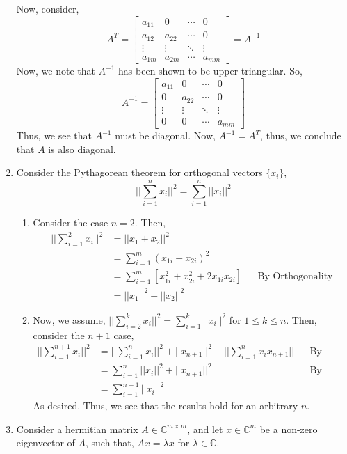 \documentclass[letterpaper,10pt]{article}
\newcommand{\C}{\mathbb{C}}
\newcommand{\NORM}{\Big|\Big|}
\begin{document}
\begin{enumerate}
Now, consider,
\[A^T=\begin{bmatrix}
a_{11} & 0 & \cdots & 0\\
a_{12} & a_{22} & \cdots & 0\\
\vdots & \vdots & \ddots & \vdots\\
a_{1m} & a_{2m} & \cdots & a_{mm}
\end{bmatrix}=A^{-1} \]
Now, we note that $A^{-1}$ has been shown to be upper triangular. So,
\[A^{-1}=\begin{bmatrix}
a_{11} & 0 & \cdots & 0\\
0 & a_{22} & \cdots & 0\\
\vdots & \vdots & \ddots & \vdots\\
0 & 0 & \cdots & a_{mm}
\end{bmatrix} \]
Thus, we see that $A^{-1}$ must be diagonal. Now, $A^{-1}=A^T$, thus, we conclude that $A$ is also diagonal.
\item Consider the Pythagorean theorem for orthogonal vectors $\{x_i\}$,
\[\NORM\sum_{i=1}^nx_i\NORM^2=\sum_{i=1}^n||x_i||^2\]
\begin{enumerate}
\item Consider the case $n=2$. Then,
\begin{align*}
\NORM\sum_{i=1}^2x_i\NORM^2 &= ||x_1+x_2||^2\\
&=\sum_{i=1}^m(x_{1i}+x_{2i})^2\\
&=\sum_{i=1}^m\left[x_{1i}^2+x_{2i}^2+2x_{1i}x_{2i}\right] && \text{By Orthogonality}\\
&=||x_1||^2+||x_2||^2
\end{align*}
\item Now, we assume, $\NORM \sum_{i=2}^kx_i\NORM^2=\sum_{i=1}^k||x_i||^2$ for $1\leq k \leq n$. Then, consider the $n+1$ case,
\begin{align*}
\NORM\sum_{i=1}^{n+1}x_i\NORM^2 &= \NORM\sum_{i=1}^{n}x_i\NORM^2+||x_{n+1}||^2+\NORM\sum_{i=1}^nx_{i}x_{n+1}\NORM && \text{By orthogonality}\\
&=\sum_{i=1}^n||x_i||^2+||x_{n+1}||^2 && \text{By assumption}\\
&=\sum_{i=1}^{n+1}||x_i||^2
\end{align*}
As desired. Thus, we see that the results hold for an arbitrary $n$.
\end{enumerate}
\item Consider a hermitian matrix $A\in \C^{m\times m}$, and let $x\in \C^m$ be a non-zero eigenvector of $A$, such that, $Ax=\lambda x$ for $\lambda\in \C$. 
\begin{enumerate}

\end{enumerate}
\end{enumerate}
\end{document}
